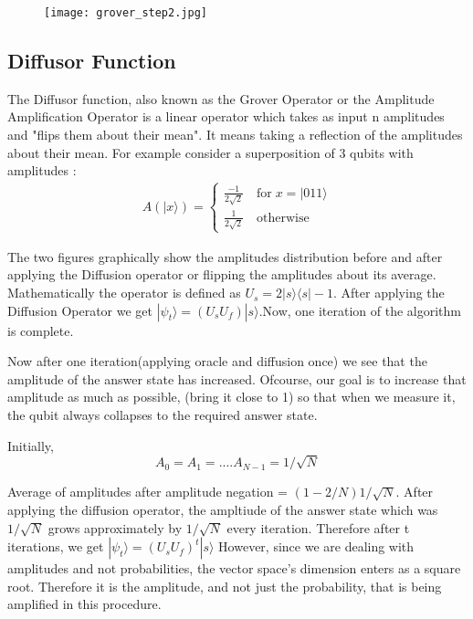 \begin{figure}[!ht]
  \centering
  \texttt{[image: grover\_step2.jpg]}
\end{figure}


\subsection{Diffusor Function}
The Diffusor function, also known as the Grover Operator or the Amplitude Amplification Operator is a linear operator which takes as input n amplitudes and "flips them about their mean". It means taking a reflection of the amplitudes about their mean.
For example consider a superposition of 3 qubits with amplitudes : \\

\begin{align*}
    A( |x\rangle) = 
    \begin{cases}
    \frac{-1}{2\sqrt{2}} \quad \text{for} \; x = |011\rangle \\
    \frac{1}{2\sqrt{2}} \quad \text{otherwise}   
    \end{cases}
\end{align*}

 The two figures graphically show the amplitudes distribution before and after applying the Diffusion operator or flipping the amplitudes about its average.
 Mathematically the operator is defined as $U_s = 2|s\rangle \langle s| -1$.
 After applying the Diffusion Operator we get $|\psi_t \rangle = (U_s U_f) |s\rangle$.Now, one iteration of the algorithm is complete.
 

Now after one iteration(applying oracle and diffusion once)  we see that the amplitude of the answer state has increased. Ofcourse, our goal is to increase that amplitude as much as possible, (bring it close to 1) so that when we measure it, the qubit always collapses to the required answer state.

Initially, 
\[ A_0 = A_1 = ....A_{N-1} = 1/\sqrt{N} \]
 
Average of amplitudes after amplitude negation = $(1-2/N)1/\sqrt{N}$. After applying the diffusion operator, the ampltiude of the answer state which was $1/\sqrt{N}$ grows approximately by $1/\sqrt{N}$ every iteration. Therefore after t iterations, we get $|\psi_t\rangle = (U_s U_f)^t |s\rangle$
However, since we are dealing with amplitudes and not probabilities, the vector space's dimension enters as a square root. Therefore it is the amplitude, and not just the probability, that is being amplified in this procedure. 

